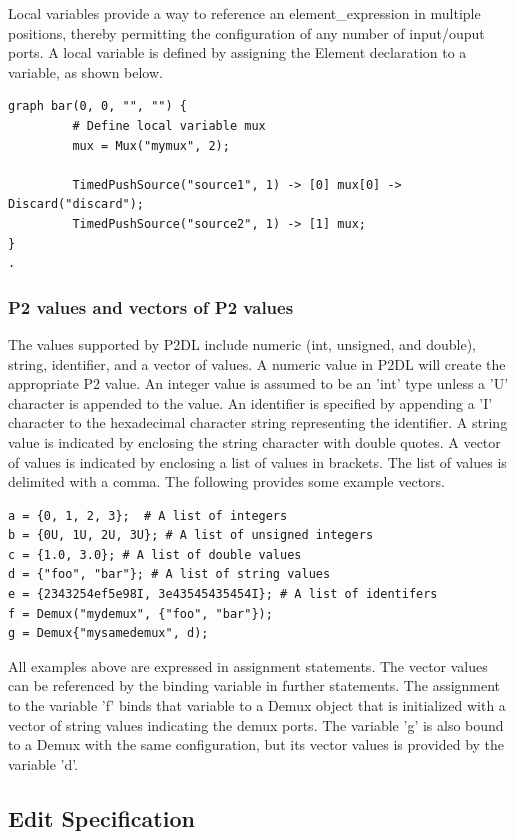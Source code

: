 \documentclass{article}
\begin{document}
Local variables provide a way
to reference an element\_expression in multiple positions, thereby permitting the 
configuration of any number of input/ouput ports. A local variable is defined
by assigning the Element declaration to a variable, as shown below.

\begin{verbatim}
graph bar(0, 0, "", "") {
         # Define local variable mux
         mux = Mux("mymux", 2);
         
         TimedPushSource("source1", 1) -> [0] mux[0] -> Discard("discard");
         TimedPushSource("source2", 1) -> [1] mux;
}
.
\end{verbatim}

\subsubsection{P2 values and vectors of P2 values}
\label{sec:p2values}

The values supported by P2DL include numeric (int, unsigned, and double), string,
identifier, and a vector of values. A numeric value in P2DL will create the appropriate
P2 value. An integer value is assumed to be an 'int' type unless a 'U' character is
appended to the value. An identifier is specified by appending a 'I' character to the
hexadecimal character string representing the identifier. A string value is indicated by enclosing
the string character with double quotes. A vector of values is indicated by enclosing
a list of values in brackets. The list of values is delimited with a comma. The following
provides some example vectors.
\begin{verbatim}
a = {0, 1, 2, 3};  # A list of integers
b = {0U, 1U, 2U, 3U}; # A list of unsigned integers
c = {1.0, 3.0}; # A list of double values
d = {"foo", "bar"}; # A list of string values
e = {2343254ef5e98I, 3e43545435454I}; # A list of identifers
f = Demux("mydemux", {"foo", "bar"});
g = Demux{"mysamedemux", d);
\end{verbatim} 

All examples above are expressed in assignment statements. The vector values
can be referenced by the binding variable in further statements. The assignment
to the variable 'f' binds that variable to a Demux object that is initialized with a vector of 
string values indicating the demux ports. The variable 'g' is also bound to a Demux
with the same configuration, but its vector values is provided by the variable 'd'.

\subsection{Edit Specification}
\label{sec:edits}
\end{document}
